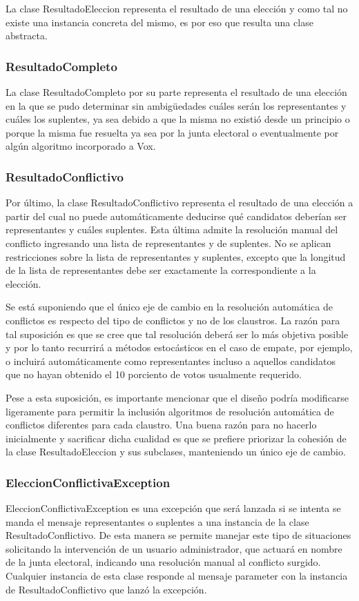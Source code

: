 La clase ResultadoEleccion representa el resultado de una elección y como tal no existe una instancia concreta del mismo, es por eso que resulta una clase abstracta. 

\subsubsection{ResultadoCompleto}
La clase ResultadoCompleto por su parte representa el resultado de una elección en la que se pudo determinar sin ambigüedades cuáles serán los representantes y cuáles los suplentes, ya sea debido a que la misma no existió desde un principio o porque la misma fue resuelta ya sea por la junta electoral o eventualmente por algún algoritmo incorporado a Vox.


\subsubsection{ResultadoConflictivo}
Por último, la clase ResultadoConflictivo representa el resultado de una elección a partir del cual no puede automáticamente deducirse qué candidatos deberían ser representantes y cuáles suplentes. Esta última admite la resolución manual del conflicto ingresando una lista de representantes y de suplentes. No se aplican restricciones sobre la lista de representantes y suplentes, excepto que la longitud de la lista de representantes debe ser exactamente la correspondiente a la elección.




Se está suponiendo que el único eje de cambio en la resolución automática de conflictos es respecto del tipo de conflictos y no de los claustros. La razón para tal suposición es que se cree que tal resolución deberá ser lo más objetiva posible y por lo tanto recurrirá a métodos estocásticos en el caso de empate, por ejemplo, o incluirá automáticamente como representantes incluso a aquellos candidatos que no hayan obtenido el 10 porciento de votos usualmente requerido.

Pese a esta suposición, es importante mencionar que el diseño podría modificarse ligeramente para permitir la inclusión algoritmos de resolución automática de conflictos diferentes para cada claustro. Una buena razón para no hacerlo inicialmente y sacrificar dicha cualidad es que se prefiere priorizar la cohesión de la clase ResultadoEleccion y sus subclases, manteniendo un único eje de cambio.


\subsubsection{EleccionConflictivaException}
EleccionConflictivaException es una excepción que será lanzada si se intenta se manda el mensaje representantes o suplentes a una instancia de la clase ResultadoConflictivo. De esta manera se permite manejar este tipo de situaciones solicitando la intervención de un usuario administrador, que actuará en nombre de la junta electoral, indicando una resolución manual al conflicto surgido. Cualquier instancia de esta clase responde al mensaje parameter con la instancia de ResultadoConflictivo que lanzó la excepción.



